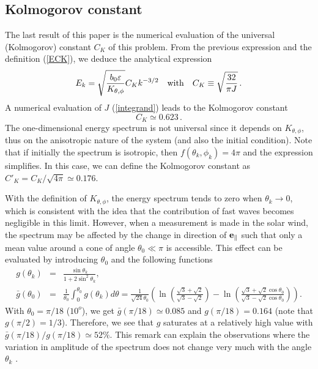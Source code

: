 \documentclass{jpp}
\def\be{\begin{equation}}
\def\ee{\end{equation}}
\def\ba{\begin{eqnarray}}
\def\ea{\end{eqnarray}}
\begin{document}
\subsection{Kolmogorov constant}

The last result of this paper is the numerical evaluation of the universal (Kolmogorov) constant $C_K$ of this problem. From the previous expression and the definition (\ref{ECK}), we deduce the analytical expression 
\be
E_k = \sqrt{\frac{b_0 \varepsilon}{K_{\theta,\phi}}} C_K k^{-3/2} \quad {\rm with} \quad C_K \equiv \sqrt{\frac{32}{\pi J}} \, .
\ee
A numerical evaluation of $J$ (\ref{integrand}) leads to the Kolmogorov constant
\be
C_K \simeq 0.623 \, .
\ee
The one-dimensional energy spectrum is not universal since it depends on $K_{\theta,\phi}$, thus on the anisotropic nature of the system (and also the initial condition). Note that if initially the spectrum is isotropic, then $f(\theta_k,\phi_k) = 4 \pi$ and the expression simplifies. In this case, we can define the Kolmogorov constant as $C'_K = C_K / \sqrt{4 \pi} \simeq 0.176$. 

With the definition of $K_{\theta,\phi}$, the energy spectrum tends to zero when $\theta_k \to 0$, which is consistent with the idea that the contribution of fast waves becomes negligible in this limit. 
However, when a measurement is made in the solar wind, the spectrum may be affected by the change in direction of ${\bf e_\parallel}$ such that only a mean value around a cone of angle $\theta_0 \ll \pi $ is accessible. This effect can be evaluated by introducing $\theta_0$ and the following functions
\ba
g(\theta_k) &=& \frac{\sin \theta_k}{1+2 \sin^2 \theta_k} , \\
\bar g(\theta_0)  &=& \frac{1}{\theta_0} \int_0^{\theta_0} g(\theta_k)  d\theta = \frac{1}{\sqrt{24}\theta_0}
\left( \ln \left( \frac{\sqrt{3}+\sqrt{2}}{\sqrt{3}-\sqrt{2}} \right) - \ln \left( \frac{\sqrt{3}+\sqrt{2} \cos \theta_0}{\sqrt{3}-\sqrt{2} \cos \theta_0} \right) \right) .
\ea
With $\theta_0 = \pi/18$ ($10^o$), we get $\bar g(\pi/18) \simeq 0.085$ and $g(\pi/18)=0.164$ (note that $g(\pi/2)=1/3$). Therefore, we see that $g$ saturates at a relatively high value with $\bar g(\pi/18) / g(\pi/18) \simeq 52\%$. 
This remark can explain the observations where the variation in amplitude of the spectrum does not change very much with the angle $\theta_k$ \citep{Zhao2022b}. 
\end{document}
